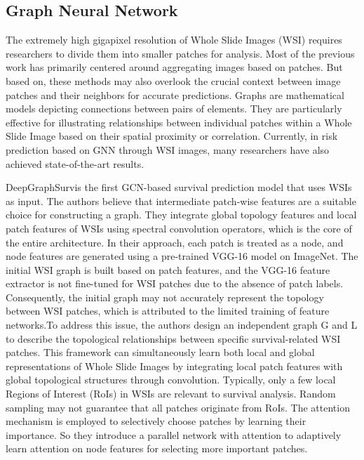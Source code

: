 \documentclass[journal,twoside,web]{ieeecolor}
\begin{document}
\subsection{Graph Neural Network}
The extremely high gigapixel resolution of Whole Slide Images (WSI) requires researchers to divide them into smaller patches for analysis. Most of the previous work has primarily centered around aggregating images based on patches. But based on\cite{levy2020topological}, these methods may also overlook the crucial context between image patches and their neighbors for accurate predictions. Graphs are mathematical models depicting connections between pairs of elements. They are particularly effective for illustrating relationships between individual patches within a Whole Slide Image based on their spatial proximity or correlation. Currently, in risk prediction based on GNN through WSI images, many researchers have also achieved state-of-the-art results.

DeepGraphSurv\cite{li2018graph}is the first GCN-based survival prediction model that uses WSIs as input. The authors believe that intermediate patch-wise features are a suitable choice for constructing a graph. They integrate global topology features and local patch features of WSIs using spectral convolution operators, which is the core of the entire architecture. In their approach, each patch is treated as a node, and node features are generated using a pre-trained VGG-16 model on ImageNet. The initial WSI graph is built based on patch features, and the VGG-16 feature extractor is not fine-tuned for WSI patches due to the absence of patch labels. Consequently, the initial graph may not accurately represent the topology between WSI patches, which is attributed to the limited training of feature networks.To address this issue, the authors design an independent graph G and  L to describe the topological relationships between specific survival-related WSI patches. This framework can simultaneously learn both local and global representations of Whole Slide Images by integrating local patch features with global topological structures through convolution. Typically, only a few local Regions of Interest (RoIs) in WSIs are relevant to survival analysis. Random sampling may not guarantee that all patches originate from RoIs. The attention mechanism is employed to selectively choose patches by learning their importance. So they introduce a parallel network with attention to adaptively learn attention on node features for selecting more important patches.
\end{document}
